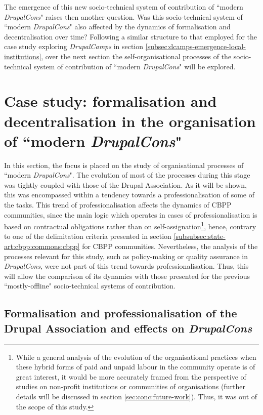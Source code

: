 The emergence of this new socio-technical system of contribution of ``modern \textit{DrupalCons}" raises then another question. Was this socio-technical system of ``modern \textit{DrupalCons}" also affected by the dynamics of formalisation and decentralisation over time? Following a similar structure to that employed for the case study exploring \textit{DrupalCamps} in section \ref{subsec:dcamps-emergence-local-institutions}, over the next section the self-organisational processes of the socio-technical system of contribution of ``modern \textit{DrupalCons}" will be explored.

\section{Case study: formalisation and decentralisation in the organisation of ``modern \textit{DrupalCons}"}
\label{subsec:dec-form-modern-dcons}

In this section, the focus is placed on the study of organisational processes of ``modern \textit{DrupalCons}". The evolution of most of the processes during this stage was tightly coupled with those of the Drupal Association. As it will be shown, this was encompassed within a tendency towards a professionalisation of some of the tasks. This trend of professionalisation affects the dynamics of CBPP communities, since the main logic which operates in cases of professionalisation is based on contractual obligations rather than on self-assignation\footnote{While a general analysis of the evolution of the organisational practices when these hybrid forms of paid and unpaid labour in the community operate is of great interest, it would be more accurately framed from the perspective of studies on non-profit institutions or communities of organisations (further details will be discussed in section \ref{sec:conc:future-work}). Thus, it was out of the scope of this study.}, hence, contrary to one of the delimitation criteria presented in section \ref{subsubsec:state-art:cbpp:commons:cbpp} for CBPP communities. Nevertheless, the analysis of the processes relevant for this study, such as policy-making or quality assurance in \textit{DrupalCons}, were not part of this trend towards professionalisation. Thus, this will allow the comparison of its dynamics with those presented for the previous ``mostly-offline" socio-technical systems of contribution.

\subsection{Formalisation and professionalisation of the Drupal Association and effects on \textit{DrupalCons}}
\label{subsec:formalis-dcons}

